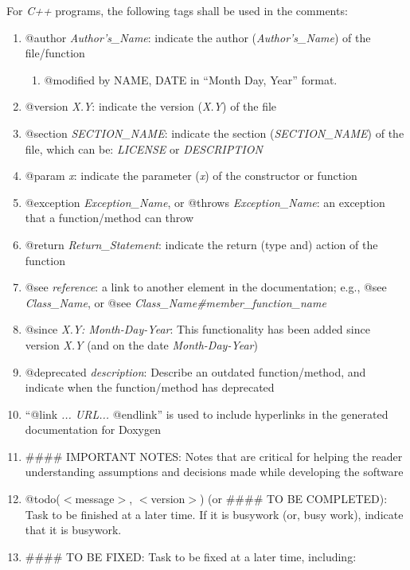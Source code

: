 \documentclass[letter,12pt]{article}
\begin{document}
For {\it C++} programs, the following tags shall be used in the comments: \vspace{-0.3cm}
\begin{enumerate} \itemsep -4pt
\item @author {\it Author's\_Name}: indicate the author ({\it Author's\_Name}) of the file/function \vspace{-0.3cm}
	\begin{enumerate} \itemsep -2pt
	\item @modified by NAME, DATE in ``Month Day, Year'' format.
	\end{enumerate}
\item @version {\it X.Y}: indicate the version ({\it X.Y}) of the file
\item @section {\it SECTION\_NAME}: indicate the section ({\it SECTION\_NAME}) of the file, which can be: {\it LICENSE} or {\it DESCRIPTION}
\item @param {\it x}: indicate the parameter ({\it x}) of the constructor or function
\item @exception {\it Exception\_Name}, or @throws {\it Exception\_Name}: an exception that a function/method can throw
\item @return {\it Return\_Statement}: indicate the return (type and) action of the function
\item @see {\it reference}: a link to another element in the documentation; e.g., @see {\it Class\_Name}, or @see {\it Class\_Name\#member\_function\_name}
\item @since {\it X.Y: Month-Day-Year}: This functionality has been added since version {\it X.Y} (and on the date {\it Month-Day-Year})
\item @deprecated {\it description}: Describe an outdated function/method, and indicate when the function/method has deprecated
\item ``@link {\it ... URL...} @endlink'' is used to include hyperlinks in the generated documentation for Doxygen
\item \#\#\#\# IMPORTANT NOTES: Notes that are critical for helping the reader understanding assumptions and decisions made while developing the software
\item @todo($<$message$>$, $<$version$>$) (or \#\#\#\# TO BE COMPLETED): Task to be finished at a later time. If it is busywork (or, busy work), indicate that it is busywork.
\item \#\#\#\# TO BE FIXED: Task to be fixed at a later time, including: \vspace{-0.3cm}

\end{enumerate}
\end{document}
